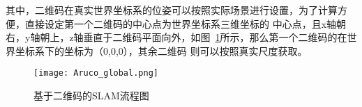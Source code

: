其中，二维码在真实世界坐标系的位姿可以按照实际场景进行设置，为了计算方便，直接设定第一个二维码的中心点为世界坐标系三维坐标的
中心点，且x轴朝右，y轴朝上，z轴垂直于二维码平面向外，如图~\ref{fig:Aruco_global}所示，那么第一个二维码的在世界坐标系下的坐标为（0,0,0），其余二维码
则可以按照真实尺度获取。
\begin{figure}[H] %
  \centering
  \texttt{[image: Aruco\_global.png]}
  \caption{基于二维码的SLAM流程图}
  \label{fig:Aruco_global}
\end{figure}
